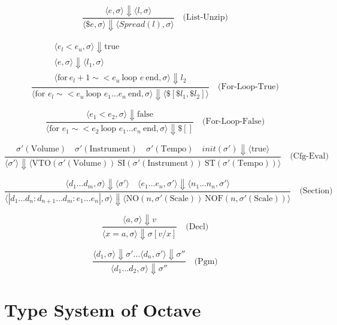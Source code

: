 \documentclass[letterpaper,12pt]{article}
\begin{document}
    
    \[
    \frac
    {\langle e, \sigma \rangle  \Downarrow \langle  l ,\sigma \rangle} 
    {\langle \$e,\sigma \rangle \Downarrow \langle Spread(l),\sigma \rangle}
    \quad \text{(List-Unzip)}
    \]
    
    
    \[
        \frac{
            \begin{array}{c}
                \langle e_l < e_u, \sigma \rangle \Downarrow \text{true} \\
                \langle e, \sigma \rangle \Downarrow \langle l_1, \sigma \rangle \\
                \langle \text{for}\ e_l+1 \sim< e_u \ \text{loop } e \ \text{end}, \sigma \rangle \Downarrow l_2
            \end{array}
        }{
            \langle \text{for } e_l \sim< e_u \ \text{loop } e_1 \dots e_n \ \text{end}, \sigma \rangle \Downarrow 
            \langle \$[\$l_1, \$l_2] \rangle
        }
        \quad \text{(For-Loop-True)}
    \]


    \[
    \frac{\langle e_1 < e_2, \sigma \rangle \Downarrow \text{false}}{\langle 
        \text{for } e_1 \sim< e_2 \ \text{loop } e_1 \dots e_n \ \text{end}, \sigma \rangle \Downarrow \$[] } \quad \text{(For-Loop-False)}
    \]
    
    \[
    \frac{\sigma'(\text{Volume}) \quad \sigma'(\text{Instrument}) \quad \sigma'(\text{Tempo}) \quad init(\sigma') \Downarrow \langle \text{true} \rangle}{\langle \sigma' \rangle \Downarrow \langle \text{VTO}(\sigma'(\text{Volume}))\ \text{SI}(\sigma'(\text{Instrument}))\ \text{ST}(\sigma'(\text{Tempo})) \rangle} \quad \text{(Cfg-Eval)}
    \]

    \[
    \frac{\langle d_1 \dots d_m, \sigma \rangle \Downarrow \langle \sigma' \rangle \quad \langle e_1 \dots e_n, \sigma' \rangle \Downarrow \langle n_1 \dots n_n , \sigma' \rangle}{\langle |d_1 \dots d_n:d_{n+1} \dots d_m:e_1 \dots e_n|, \sigma\rangle \Downarrow \langle 
    \text{NO}(n, \sigma'(\text{Scale}))\
    \text{NOF}(n, \sigma'(\text{Scale}))
    \rangle} \quad \text{(Section)}
    \]

    \[
    \frac{\langle a, \sigma \rangle \Downarrow v}{\langle x = a, \sigma \rangle \Downarrow \sigma[v/x]} \quad \text{(Decl)}
    \]

    \[
    \frac{\langle d_1, \sigma \rangle \Downarrow \sigma' \dots \langle d_n, \sigma' \rangle \Downarrow \sigma''}{\langle d_1 \dots d_2, \sigma \rangle \Downarrow \sigma''} \quad \text{(Pgm)}
    \]
    

\section{Type System of Octave}
\end{document}
